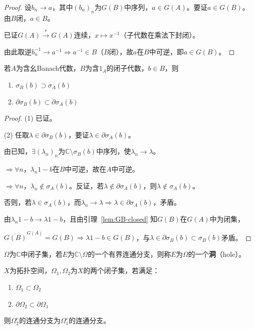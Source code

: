\documentclass[lang=cn,a4paper,newtx,section]{elegantbook}
\begin{document}
\begin{proof}
  设$b_n \to a$，其中$(b_n)_n$为$G(B)$中序列，$a \in G(A)$。要证$a \in G(B)$。由$B$闭，$a \in B$。
  
  已证$G(A) \xrightarrow{r} G(A)$连续，$x \mapsto x^{-1}$（子代数在乘法下封闭）。
  
  由此取逆$b_n^{-1} \to a^{-1} \Rightarrow a^{-1} \in B$（$B$闭），故$a$在$B$中可逆，即$a \in G(B)$。
\end{proof}

\begin{lemma}
  若$A$为含幺Banach代数，$B$为含$1_A$的闭子代数，$b \in B$，则
  \begin{enumerate}
    \item $\sigma_B(b) \supset \sigma_A(b)$
    \item $\partial\sigma_B(b) \subset \partial\sigma_A(b)$
  \end{enumerate}
\end{lemma}

\begin{proof}
  (1) 已证。
  
  (2) 任取$\lambda \in \partial\sigma_B(b)$，要证$\lambda \in \partial\sigma_A(b)$。
  
  由已知，$\exists (\lambda_n)_n$为$\mathbb{C} \setminus \sigma_B(b)$中序列，使$\lambda_n \to \lambda$。
  
  $\Rightarrow \forall n$，$\lambda_n 1 - b$在$B$中可逆，故在$A$中可逆。
  
  $\Rightarrow \forall n$，$\lambda_n \notin \sigma_A(b)$。反证，若$\lambda \notin \partial\sigma_A(b)$，则$\lambda \notin \sigma_A(b)$。
  
  否则，若$\lambda \in \sigma_A(b)$，而$\lambda_n \to \lambda \Rightarrow \lambda \in \partial\sigma_A(b)$，矛盾。
  
  由$\lambda_n 1 - b \to \lambda 1 - b$，且由引理~\ref{lem:GB-closed} 知$G(B)$在$G(A)$中为闭集，
  
  $\overline{G(B)}^{G(A)} = G(B) \Rightarrow \lambda 1 - b \in G(B)$，与$\lambda \in \partial\sigma_B(b) \subset \sigma_B(b)$矛盾。
\end{proof}

\begin{definition}[洞]
  $\Omega$为$\mathbb{C}$中闭子集，若$E$为$\mathbb{C} \setminus \Omega$的一个有界连通分支，则称$E$为$\Omega$的一个\textbf{洞}（hole）。
\end{definition}

\begin{lemma}
  $X$为拓扑空间，$\Omega_1, \Omega_2$为$X$的两个闭子集，若满足：
  \begin{enumerate}
    \item $\Omega_1 \subset \Omega_2$
    \item $\partial\Omega_2 \subset \partial\Omega_1$
  \end{enumerate}
  则$\Omega_2^c$的连通分支为$\Omega_1^c$的连通分支。
\end{lemma}
\end{document}
